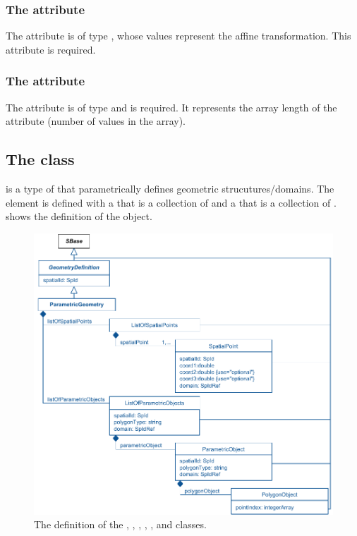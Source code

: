 \subsubsection{The  attribute}
The  attribute is of type , whose values represent the affine transformation. This attribute is required.

\subsubsection{The  attribute}
The  attribute is of type  and is required. It represents the array length of the  attribute (number of values in the  array).


\subsection{The  class}
\label{ParametricGeometry-class}
\label{ListOfSpatialPoints-class}
\label{ListOfParametricObjects-class}
\ParametricGeometry is a type of \GeometryDefinition that parametrically defines geometric strucutures/domains. The \ParametricGeometry element is defined with a  that is a collection of \ParametricObjects and a  that is a collection of \SpatialPoints.  shows the definition of the \ParametricGeometry object.

\begin{figure}[ht]
  \includegraphics{figs/ParametricGeometry-uml}
  \caption{The definition of the \ParametricGeometry, \ListOfSpatialPoints, \SpatialPoint, \ListOfParametricObjects, \ParametricObject, and \PolygonObject classes.}
  \label{ParametricGeometry-uml}
  \label{ListOfSpatialPoints-uml}
  \label{SpatialPoint-uml}
  \label{ListOfParametricObjects-uml}
  \label{ParametricObject-uml}
  \label{PolygonObject-uml}
\end{figure}


